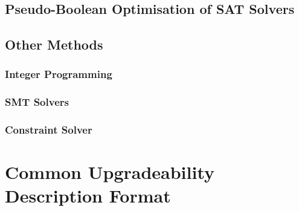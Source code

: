 \subsection{Pseudo-Boolean Optimisation of SAT Solvers}



\subsection{Other Methods}
\subsubsection{Integer Programming}
\subsubsection{SMT Solvers}
\subsubsection{Constraint Solver}

\section{Common Upgradeability Description Format}
{}\cite{treinen2009common}



